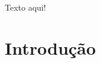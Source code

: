 \documentclass[12pt]{article}
\begin{document}
\begin{resumo} 

Texto aqui!

\end{resumo}

\section{Introdução}
\end{document}
